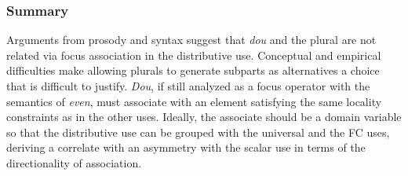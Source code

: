 \documentclass[12pt]{article}
\begin{document}
\subsubsection{Summary}
\label{ssub:summary}


Arguments from prosody and syntax suggest that \emph{dou} and the plural are not related via focus association in the distributive use.
Conceptual and empirical difficulties make allowing plurals to generate subparts as alternatives a choice that is difficult to justify.
\emph{Dou}, if still analyzed as a focus operator with the semantics of \emph{even}, must associate with an element satisfying the same locality constraints as in the other uses.
Ideally, the associate should be a domain variable so that the distributive use can be grouped with the universal and the FC uses, deriving a correlate with an asymmetry with the scalar use in terms of the directionality of association.
\end{document}
